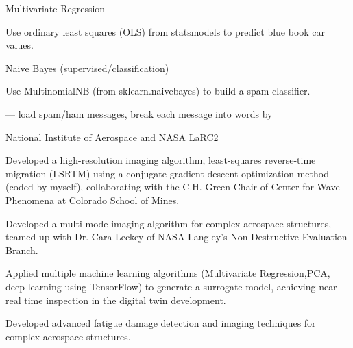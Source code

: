 

\begin{cventries}

  \cventryprojtruee
    {Multivariate Regression} %
	 {     
     \begin{cvitems} %
       \item {Use ordinary least squares (OLS) from statsmodels to predict blue book car values.}
      \end{cvitems}
         } 
 
  \cventryprojtruee
    {Naive Bayes (supervised/classification)} %
	 {     
     \begin{cvitems} %
       \item {Use MultinomialNB (from sklearn.naive\textunderscore bayes) to build a spam classifier.}
       \item {--- load spam/ham messages, break each message into words by }
      \end{cvitems}
         } 
         
  \cventryprojtruee
    {National Institute of Aerospace and NASA LaRC2} %
	 {     
     \begin{cvitems} %
       \item {Developed a high-resolution imaging algorithm, least-squares reverse-time migration (LSRTM) using a conjugate gradient descent optimization method (coded by myself), collaborating with the C.H. Green Chair of Center for Wave Phenomena at Colorado School of Mines. }
       \item {Developed a multi-mode imaging algorithm for complex aerospace structures, teamed up with Dr. Cara Leckey of NASA Langley's Non-Destructive Evaluation Branch.}
       \item {Applied multiple machine learning algorithms (Multivariate Regression,PCA, deep learning using TensorFlow) to generate a surrogate model, achieving near real time inspection in the digital twin development.}
       \item {Developed advanced fatigue damage detection and imaging techniques for complex aerospace structures.}
      \end{cvitems}
         }
         


\end{cventries}
